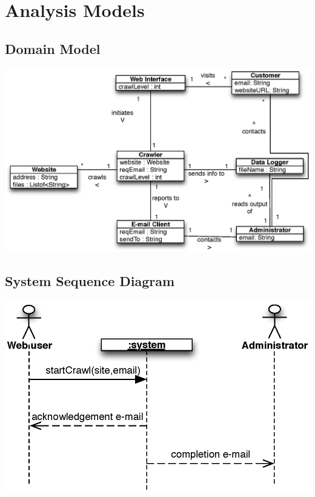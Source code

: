 \documentclass{article}
\begin{document}
\newpage
\section{Analysis Models}
\subsection{Domain Model}
\includegraphics[width=\textwidth]{374DM.eps}
\subsection{System Sequence Diagram}
\includegraphics[width=\textwidth]{SSD}
\end{document}
